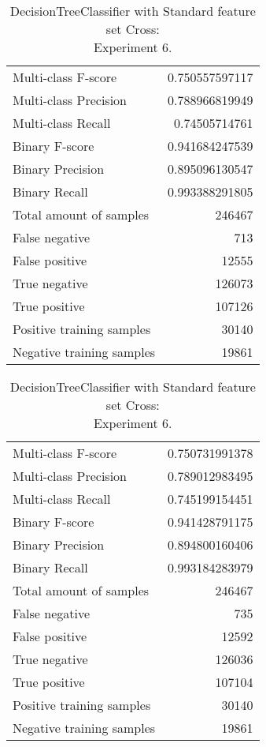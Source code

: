 \begin{table}[H]
\begin{minipage}{0.5\textwidth}
\caption{DecisionTreeClassifier with Standard feature set Cross: \\Experiment 5.}
\centering
\begin{tabular}{l r}
\toprule
Multi-class F-score & 0.750557597117 \\
Multi-class Precision & 0.788966819949 \\
Multi-class Recall & 0.74505714761 \\
\midrule
Binary F-score & 0.941684247539 \\
Binary Precision & 0.895096130547 \\
Binary Recall & 0.993388291805 \\
\midrule
Total amount of samples & 246467 \\
False negative & 713 \\
False positive & 12555 \\
True negative & 126073 \\
True positive & 107126 \\
\midrule
Positive training samples & 30140 \\
Negative training samples & 19861 \\
\bottomrule
\end{tabular}
\end{minipage}
\hfillx
\begin{minipage}{0.5\textwidth}
\caption{DecisionTreeClassifier with Standard feature set Cross: \\Experiment 6.}
\centering
\begin{tabular}{l r}
\toprule
Multi-class F-score & 0.750731991378 \\
Multi-class Precision & 0.789012983495 \\
Multi-class Recall & 0.745199154451 \\
\midrule
Binary F-score & 0.941428791175 \\
Binary Precision & 0.894800160406 \\
Binary Recall & 0.993184283979 \\
\midrule
Total amount of samples & 246467 \\
False negative & 735 \\
False positive & 12592 \\
True negative & 126036 \\
True positive & 107104 \\
\midrule
Positive training samples & 30140 \\
Negative training samples & 19861 \\
\bottomrule
\end{tabular}
\end{minipage}
\end{table}

